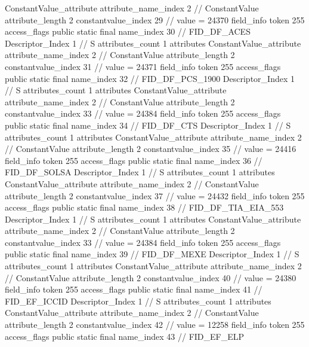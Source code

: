 {{{{{{				ConstantValue_attribute {
					attribute_name_index	2		// ConstantValue
					attribute_length	2
					constantvalue_index	29		// value = 24370
				}
				}
			}
			field_info {
				token	255
				access_flags	public static final
				name_index	30		// FID_DF_ACES
				Descriptor_Index	1		// S
				attributes_count	1
				attributes {
				ConstantValue_attribute {
					attribute_name_index	2		// ConstantValue
					attribute_length	2
					constantvalue_index	31		// value = 24371
				}
				}
			}
			field_info {
				token	255
				access_flags	public static final
				name_index	32		// FID_DF_PCS_1900
				Descriptor_Index	1		// S
				attributes_count	1
				attributes {
				ConstantValue_attribute {
					attribute_name_index	2		// ConstantValue
					attribute_length	2
					constantvalue_index	33		// value = 24384
				}
				}
			}
			field_info {
				token	255
				access_flags	public static final
				name_index	34		// FID_DF_CTS
				Descriptor_Index	1		// S
				attributes_count	1
				attributes {
				ConstantValue_attribute {
					attribute_name_index	2		// ConstantValue
					attribute_length	2
					constantvalue_index	35		// value = 24416
				}
				}
			}
			field_info {
				token	255
				access_flags	public static final
				name_index	36		// FID_DF_SOLSA
				Descriptor_Index	1		// S
				attributes_count	1
				attributes {
				ConstantValue_attribute {
					attribute_name_index	2		// ConstantValue
					attribute_length	2
					constantvalue_index	37		// value = 24432
				}
				}
			}
			field_info {
				token	255
				access_flags	public static final
				name_index	38		// FID_DF_TIA_EIA_553
				Descriptor_Index	1		// S
				attributes_count	1
				attributes {
				ConstantValue_attribute {
					attribute_name_index	2		// ConstantValue
					attribute_length	2
					constantvalue_index	33		// value = 24384
				}
				}
			}
			field_info {
				token	255
				access_flags	public static final
				name_index	39		// FID_DF_MEXE
				Descriptor_Index	1		// S
				attributes_count	1
				attributes {
				ConstantValue_attribute {
					attribute_name_index	2		// ConstantValue
					attribute_length	2
					constantvalue_index	40		// value = 24380
				}
				}
			}
			field_info {
				token	255
				access_flags	public static final
				name_index	41		// FID_EF_ICCID
				Descriptor_Index	1		// S
				attributes_count	1
				attributes {
				ConstantValue_attribute {
					attribute_name_index	2		// ConstantValue
					attribute_length	2
					constantvalue_index	42		// value = 12258
				}
				}
			}
			field_info {
				token	255
				access_flags	public static final
				name_index	43		// FID_EF_ELP
}}}}}
